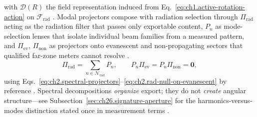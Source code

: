 with \(\mathcal{D}(R)\) the field representation induced from
Eq.~\eqref{eq:ch1.active-rotation-action} on \(\mathcal{F}_{\mathrm{rad}}\)
\cite{stratton1941}. Modal projectors compose with radiation selection through
$\Pi_{\mathrm{rad}}$ acting as the radiation filter that passes only exportable content,
$P_n$ as mode-selection lenses that isolate individual beam families from a measured pattern,
and $\Pi_{\mathrm{ev}}$, $\Pi_{\mathrm{non}}$ as projectors onto evanescent and
non-propagating sectors that qualified far-zone meters cannot resolve
\cite{stratton1941}.
\begin{equation}
\label{eq:ch2.spectral-resolution-composition}
\Pi_{\mathrm{rad}}
=
\sum_{n\in\mathcal{N}_{\mathrm{rad}}} P_n,
\qquad
P_n\Pi_{\mathrm{ev}}=P_n\Pi_{\mathrm{non}}=\mathbf{0},
\end{equation}
using Eqs.~\eqref{eq:ch2.spectral-projectors}--\eqref{eq:ch2.rad-null-on-evanescent} by reference
\cite{stratton1941}. Spectral decompositions \emph{organize} export; they do not
\emph{create} angular structure---see Subsection~\ref{sec:ch26.signature-aperture} for the
harmonics-versus-modes distinction stated once in measurement terms \cite{stratton1941}.
